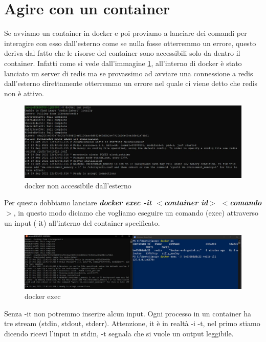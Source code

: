 \documentclass[11pt,a4paper]{book}
\begin{document}
\section{Agire con un container}
Se avviamo un container in docker e poi proviamo a lanciare dei comandi per interagire con esso dall'esterno come se nulla fosse otterremmo un errore, questo deriva dal fatto che le risorse del container sono accessibili solo da dentro il container. Infatti come si vede dall'immagine \ref{fig: 006}, all'interno di docker è stato lanciato un server di redis ma se provassimo ad avviare una connessione a redis dall'esterno direttamente otterremmo un errore nel quale ci viene detto che redis non è attivo.
\begin{figure}[h!]
	\begin{center}
		\includegraphics[scale=0.6]{img/006.jpg}
		\caption{docker non accessibile dall'esterno}
		\label{fig: 006}
	\end{center}
\end{figure}

Per questo dobbiamo lanciare \emph\textbf{{docker exec -it $<$container id$>$ $<$comando$>$}}, in questo modo diciamo che vogliamo eseguire un comando (exec) attraverso un input (-it) all'interno del container specificato.

\begin{figure}[h!]
	\begin{center}
		\includegraphics[scale=0.6]{img/007.jpg}
		\caption{docker exec}
		\label{fig: 007}
	\end{center}
\end{figure}

Senza -it non potremmo inserire alcun input. Ogni processo in un container ha tre stream (stdin, stdout, stderr). Attenzione, it è in realtà -i -t, nel primo stiamo dicendo ricevi l'input in stdin, -t segnala che si vuole un output leggibile.
\end{document}
